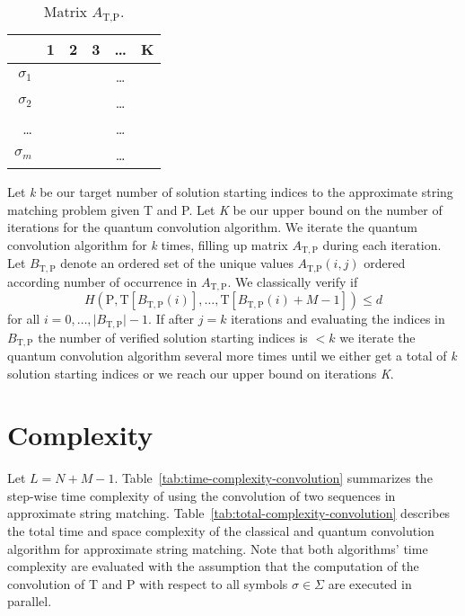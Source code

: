 	\begin{table}[h!]
		\centering
		\begin{tabular}{| r || c | c | c | c | c |}
			\hline
			                   & 1 & 2 & 3 & \ldots & K\\
			\hline\hline
			$\sigma_1$ &    &    &    & \ldots &   \\ 
			\hline
			$\sigma_2$ &    &    &    & \ldots &   \\ 
			\hline
			\ldots          &    &    &    & \ldots &   \\ 
			\hline
			$\sigma_m$ &    &    &    & \ldots &   \\
			\hline
		\end{tabular}
		\caption{Matrix $A_{\text{T},\text{P}}$.}
		\label{tab:A_matrix}
	\end{table}
Let \textit{k} be our target number of solution starting indices to the approximate string matching problem given T and P. Let \textit{K} be our upper bound on the number of iterations for the quantum convolution algorithm. We iterate the quantum convolution algorithm for \textit{k} times, filling up matrix $A_{\mathrm{T},\mathrm{P}}$ during each iteration. Let $B_{\mathrm{T},\mathrm{P}}$ denote an ordered set of the unique values $A_{\text{T},\text{P}}(i,j)$ ordered according number of occurrence in $A_{\mathrm{T},\mathrm{P}}$. We classically verify if 
\[
	H\left(\text{P},\text{T}[B_{\mathrm{T},\mathrm{P}}(i)],\ldots,\text{T}[B_{\mathrm{T},\mathrm{P}}(i) + M - 1]\right) \leq d
\] 
for all $i=0,\ldots,\vert B_{\mathrm{T},\mathrm{P}} \vert - 1$. If after $j=k$ iterations and evaluating the indices in $B_{\mathrm{T},\mathrm{P}}$ the number of verified solution starting indices is $< k$ we iterate the quantum convolution algorithm several more times until we either get a total of \textit{k} solution starting indices or we reach our upper bound on iterations \textit{K}.

\section{Complexity}\label{sec:time-space-complexity}
Let $L=N+M-1$. Table~\ref{tab:time-complexity-convolution} summarizes the step-wise time complexity of using the convolution of two sequences in approximate string matching. Table~\ref{tab:total-complexity-convolution} describes the total time and space complexity of the classical and quantum convolution algorithm for approximate string matching. Note that both algorithms' time complexity are evaluated with the assumption that the computation of the convolution of T and P with respect to all symbols $\sigma \in \Sigma$ are executed in parallel.

